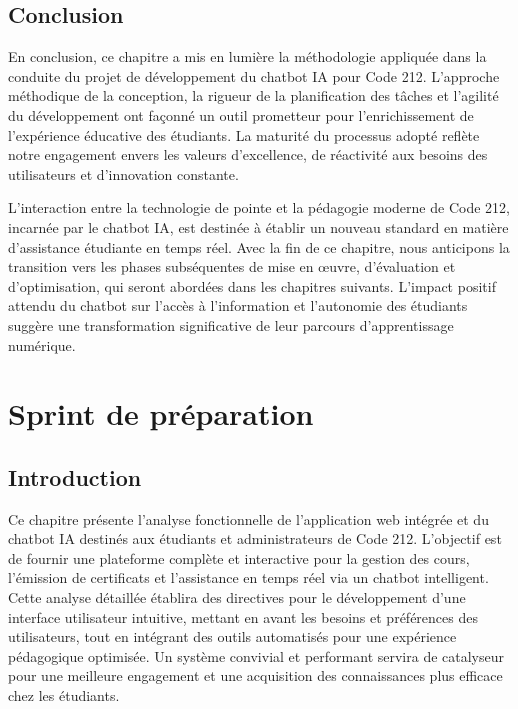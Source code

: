 \documentclass[a4paper, 11pt, openany]{report}
\begin{document}
\section{Conclusion}
En conclusion, ce chapitre a mis en lumière la méthodologie appliquée dans la conduite du projet de développement du chatbot IA pour Code 212. L'approche méthodique de la conception, la rigueur de la planification des tâches et l'agilité du développement ont façonné un outil prometteur pour l'enrichissement de l'expérience éducative des étudiants. La maturité du processus adopté reflète notre engagement envers les valeurs d'excellence, de réactivité aux besoins des utilisateurs et d'innovation constante.

L'interaction entre la technologie de pointe et la pédagogie moderne de Code 212, incarnée par le chatbot IA, est destinée à établir un nouveau standard en matière d'assistance étudiante en temps réel. Avec la fin de ce chapitre, nous anticipons la transition vers les phases subséquentes de mise en œuvre, d'évaluation et d'optimisation, qui seront abordées dans les chapitres suivants. L'impact positif attendu du chatbot sur l'accès à l'information et l'autonomie des étudiants suggère une transformation significative de leur parcours d'apprentissage numérique.

\chapter{Sprint de préparation}

\section{Introduction}
Ce chapitre présente l'analyse fonctionnelle de l'application web intégrée et du chatbot IA destinés aux étudiants et administrateurs de Code 212. L'objectif est de fournir une plateforme complète et interactive pour la gestion des cours, l'émission de certificats et l'assistance en temps réel via un chatbot intelligent. Cette analyse détaillée établira des directives pour le développement d'une interface utilisateur intuitive, mettant en avant les besoins et préférences des utilisateurs, tout en intégrant des outils automatisés pour une expérience pédagogique optimisée. Un système convivial et performant servira de catalyseur pour une meilleure engagement et une acquisition des connaissances plus efficace chez les étudiants.
\end{document}
